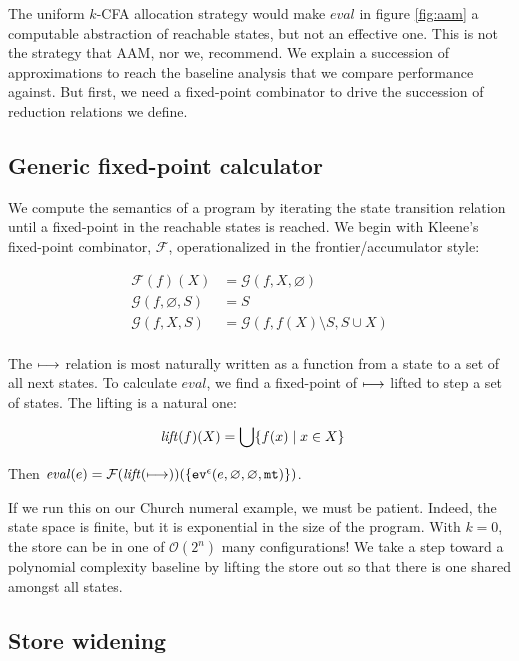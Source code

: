 \documentclass[preprint,onecolumn,9pt]{sigplanconf} %
\begin{document}
The uniform $k$-CFA allocation strategy would make $eval$ in figure
\ref{fig:aam} a computable abstraction of reachable states, but not an
effective one. This is not the strategy that AAM, nor we,
recommend. We explain a succession of approximations to reach the
baseline analysis that we compare performance against. But first, we
need a fixed-point combinator to drive the succession of reduction
relations we define.

\subsection{Generic fixed-point calculator}
\label{sec:fixpoint}

We compute the semantics of a program by iterating the state
transition relation until a fixed-point in the reachable states is
reached. We begin with Kleene's fixed-point combinator, ${\mathcal F}$,
operationalized in the frontier/accumulator style:

\begin{align*}
{\mathcal F}(f)(X) &= {\mathcal G}(f, X, \varnothing) \\
{\mathcal G}(f, \varnothing, S) &= S \\
{\mathcal G}(f, X, S) &= {\mathcal G}(f, f(X) \setminus S, S \cup X) \\
\end{align*}

The $\machstep$ relation is most naturally written as a function from
a state to a set of all next states. To calculate $eval$, we find a fixed-point of
$\machstep$ lifted to step a set of states. The lifting is a natural one:

\begin{align*}
\lift(f)(X) &= \bigcup\{f(x) \mid x \in X\}
\end{align*}

Then $\eval(e) = {\mathcal F}(\lift(\machstep))(\{\ev[^\mtcntr]{e, \varnothing, \varnothing, \kmt}\})$.

If we run this on our Church numeral example, we must be
patient. Indeed, the state space is finite, but it is exponential in
the size of the program. With $k = 0$, the store can be in one of ${\mathcal
  O}(2^n)$ many configurations! We take a step toward a polynomial
complexity baseline by lifting the store out so that there is one
shared amongst all states.

\subsection{Store widening}
\label{sec:storewiden}
\end{document}
